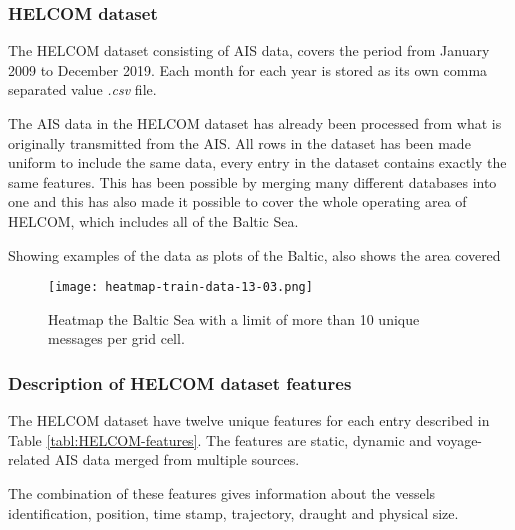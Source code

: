 \documentclass[../main.tex]{subfiles}
\begin{document}
\subsubsection{HELCOM dataset}

The HELCOM dataset consisting of AIS data, covers the period from January 2009 to December 2019. Each month for each year is stored as its own comma separated value \textit{.csv} file.

The AIS data in the HELCOM dataset has already been processed from what is originally transmitted from the AIS. All rows in the dataset has been made uniform to include the same data, every entry in the dataset contains exactly the same features. This has been possible by merging many different databases into one and this has also made it possible to cover the whole operating area of HELCOM, which includes all of the Baltic Sea.

Showing examples of the data as plots of the Baltic, also shows the area covered

\begin{figure}[H]
\centering
\texttt{[image: heatmap-train-data-13-03.png]}
\caption{Heatmap the Baltic Sea with a limit of more than 10 unique messages per grid cell.}
\label{fig:heatmap}
\end{figure}

\subsubsection{Description of HELCOM dataset features}

The HELCOM dataset have twelve unique features for each entry described in Table \ref{tabl:HELCOM-features}. The features are static, dynamic and voyage-related AIS data merged from multiple sources.

The combination of these features gives information about the vessels identification, position, time stamp, trajectory, draught and physical size. 
\end{document}
